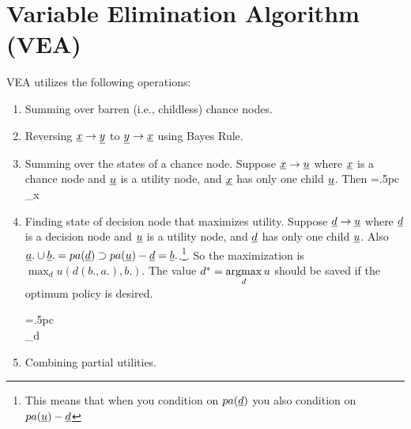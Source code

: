 \section{Variable Elimination Algorithm (VEA)}


VEA utilizes the following operations:
\begin{enumerate}
\item Summing over barren (i.e., childless) chance nodes.
\item Reversing $\rvx\rarrow \rvy$
to $\rvy\rarrow \rvx$
using Bayes Rule.
\beq
\bcen
{}
\ecen
\quad
{}\quad
\bcen
{}\ecen
\eeq

\item Summing over the states of a chance node. Suppose
$\rvx\rarrow \rvu$
where $\rvx$ is a chance node and $\rvu$
is a utility node, and $\rvx$ has only one child $\rvu$. Then
\beq
\bcen
{}\ecen
\bcen
\xymatrix@R=.5pc{
\implies
\\
\sum_x}
\ecen
\bcen
{}\ecen
\eeq

\item Finding state of decision node that maximizes utility.
Suppose $\rvd\rarrow \rvu$
where $\rvd$ is a decision node and $\rvu$
is a utility node, and $\rvd$ has only
one child $\rvu$. Also
$\rva.\cup\rvb.=pa(\rvd)\supset pa(\rvu)-\rvd=\rvb.$.\footnote{
This means that when you condition on
$pa(\rvd)$ you also
condition on $pa(\rvu)-\rvd$}. So the
maximization is $\max_du (d(b., a.), b.)$.
The value $d^*=\mathop{\mathrm{argmax}}\limits_d u$
should be saved
if the optimum policy is desired.

\beq
\bcen
{}\ecen
\bcen
\xymatrix@R=.5pc{\implies
\\
\max_{d}}
\ecen
\bcen
{}\ecen
\eeq

\item Combining partial
utilities.
\beq
\bcen
{}
\ecen
\quad
{}\quad
\bcen
{}\ecen
\eeq
\end{enumerate}

